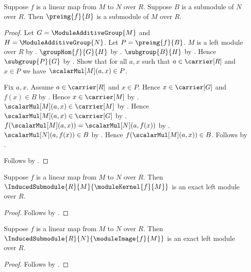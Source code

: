 \begin{theorem}\label{linear_map_submodule_preimage}
    Suppose $f$ is a linear map from $M$ to $N$ over $R$.
    Suppose $B$ is a submodule of $N$ over $R$.
    Then $\preimg{f}{B}$ is a submodule of $M$ over $R$.
\end{theorem}
\begin{proof}
    Let $G=\ModuleAdditiveGroup{M}$ and
        $H=\ModuleAdditiveGroup{N}$.
    Let $P=\preimg{f}{B}$.
    $M$ is a left module over $R$ by
        .
    $\groupHom{f}{G}{H}$ by
        .
    $\subgroup{B}{H}$ by .
    Hence $\subgroup{P}{G}$ by
        .
    Show that for all $a,x$ such that $a\in\carrier[R]$ and $x\in P$
        we have $\scalarMul[M](a,x)\in P$.
    \begin{subproof}
        Fix $a,x$.
        Assume $a\in\carrier[R]$ and $x\in P$.
        Hence $x\in\carrier[G]$ and $f(x)\in B$ by
            .
        Hence $x\in\carrier[M]$ by
            .
        $\scalarMul[M](a,x)\in\carrier[M]$ by
            .
        Hence $\scalarMul[M](a,x)\in\carrier[G]$ by
            .
        $f(\scalarMul[M](a,x))=\scalarMul[N](a,f(x))$ by
            .
        $\scalarMul[N](a,f(x))\in B$ by
            .
        Hence $f(\scalarMul[M](a,x))\in B$.
        Follows by .
    \end{subproof}
    Follows by .
\end{proof}

\begin{corollary}\label{induced_module_kernel_is_exact}
    Suppose $f$ is a linear map from $M$ to $N$ over $R$.
    Then $\InducedSubmodule{R}{M}{\moduleKernel{f}{M}}$
        is an exact left module over $R$.
\end{corollary}
\begin{proof}
    Follows by
        .
\end{proof}

\begin{corollary}\label{induced_module_image_is_exact}
    Suppose $f$ is a linear map from $M$ to $N$ over $R$.
    Then $\InducedSubmodule{R}{N}{\moduleImage{f}{M}}$
        is an exact left module over $R$.
\end{corollary}
\begin{proof}
    Follows by
        .
\end{proof}

